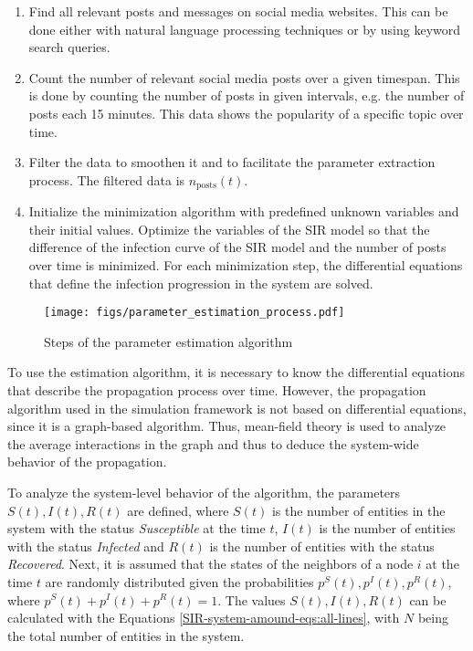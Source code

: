 \begin{enumerate}
    \item Find all relevant posts and messages on social media websites.
    This can be done either with natural language processing techniques or
    by using keyword search queries.
    \item Count the number of relevant social media posts over a given 
    timespan. This is done by counting the number of posts in given intervals, 
    e.g. the number of posts each 15 minutes. This data shows the
    popularity of a specific topic over time.
    \item Filter the data to smoothen it and to facilitate the
    parameter extraction process. The filtered data is $n_{\mathrm{posts}}(t)$.
    \item Initialize the minimization algorithm with predefined unknown
    variables and their initial values. Optimize the variables of the SIR model
    so that the difference of the infection curve of the SIR model
    and the number of posts over time is minimized. For each minimization
    step, the differential equations that define the infection progression
    in the system are solved.
\end{enumerate}

\begin{figure}[!ht]
    \center
    \texttt{[image: figs/parameter\_estimation\_process.pdf]}
    \caption{Steps of the parameter estimation algorithm}
    \label{paramestimationbasic}
\end{figure}

To use the estimation algorithm, it is necessary to 
know the differential equations that describe the propagation 
process over time. However, the propagation algorithm
used in the simulation framework is not based on differential equations,
since it is a graph-based algorithm. 
Thus, mean-field theory is used to 
analyze the average interactions in the graph and thus to deduce 
the system-wide behavior of the propagation. 


To analyze the system-level behavior of the algorithm,
the parameters $S(t), I(t), R(t)$ are defined, where $S(t)$ is the number of
entities in the system with the status \textit{Susceptible} at the time $t$, 
$I(t)$ is the number of entities with the status \textit{Infected} and
$R(t)$ is the number of entities with the status \textit{Recovered}. 
Next, it is assumed that the states of the neighbors of a node $i$ 
at the time $t$ are randomly distributed given the probabilities 
$p^S(t), p^I(t), p^R(t)$, where $p^S(t) + p^I(t) + p^R(t) = 1$. 
The values $S(t), I(t), R(t)$ can be calculated
with the Equations \ref{SIR-system-amound-eqs:all-lines},
with $N$ being the total number of entities in the system.


